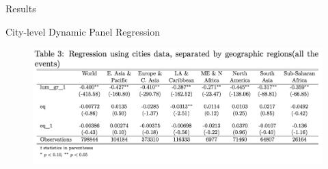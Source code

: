 \documentclass{beamer}
\begin{document}
\begin{section}{Results}
  \begin{frame}{City-level Dynamic Panel Regression}
    \begin{figure}
      \centering
      \includegraphics[width=\linewidth]{table3}\label{fig:table3}
    \end{figure}

\end{frame}
\end{section}
\end{document}
